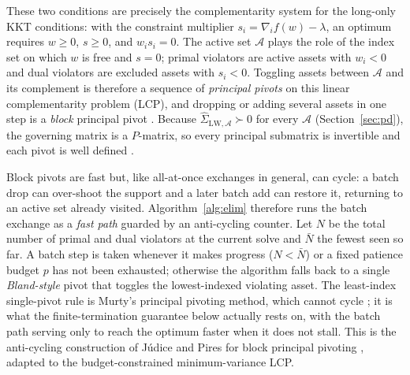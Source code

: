 These two conditions are precisely the complementarity system for the long-only KKT
conditions: with the constraint multiplier $s_i = \nabla_i f(w) - \lambda$, an optimum
requires $w \geq 0$, $s \geq 0$, and $w_i s_i = 0$. The active set $\mathcal{A}$ plays
the role of the index set on which $w$ is free and $s = 0$; primal violators are
active assets with $w_i < 0$ and dual violators are excluded assets with $s_i < 0$.
Toggling assets between $\mathcal{A}$ and its complement is therefore a sequence of
\emph{principal pivots} on this linear complementarity problem (LCP), and dropping or
adding several assets in one step is a \emph{block} principal pivot
\cite{judice1994,kim2011}. Because $\hat\Sigma_{\mathrm{LW},\mathcal{A}} \succ 0$ for
every $\mathcal{A}$ (Section~\ref{sec:pd}), the governing matrix is a $P$-matrix, so
every principal submatrix is invertible and each pivot is well defined
\cite{murty1988}.

Block pivots are fast but, like all-at-once exchanges in general, can cycle: a batch
drop can over-shoot the support and a later batch add can restore it, returning to an
active set already visited. Algorithm~\ref{alg:elim} therefore runs the batch exchange
as a \emph{fast path} guarded by an anti-cycling counter. Let $N$ be the total number
of primal and dual violators at the current solve and $\bar N$ the fewest seen so far.
A batch step is taken whenever it makes progress ($N < \bar N$) or a fixed patience
budget $p$ has not been exhausted; otherwise the algorithm falls back to a single
\emph{Bland-style} pivot that toggles the lowest-indexed violating asset. The
least-index single-pivot rule is Murty's principal pivoting method, which cannot cycle
\cite{murty1988}; it is what the finite-termination guarantee below actually rests on,
with the batch path serving only to reach the optimum faster when it does not stall.
This is the anti-cycling construction of J\'udice and Pires for block principal
pivoting \cite{judice1994}, adapted to the budget-constrained minimum-variance LCP.

